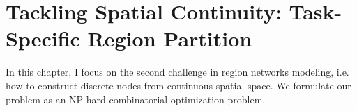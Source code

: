 \chapter{Tackling Spatial Continuity: Task-Specific Region Partition}
\label{ch:partition}

In this chapter, I focus on the second challenge in region networks modeling, i.e. how to construct discrete nodes from continuous spatial space. We formulate our problem as an NP-hard combinatorial optimization problem. 







